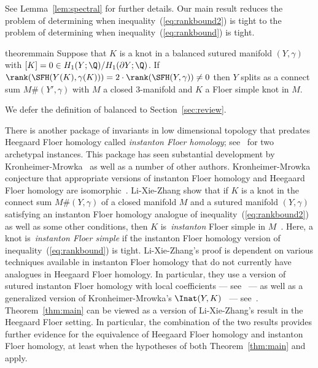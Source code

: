 \documentclass{amsart}
\theoremstyle{definition}
\theoremstyle{remark}
\numberwithin{equation}{section}
\begin{document}
See Lemma~\ref{lem:spectral} for further details. Our main result reduces the problem of determining when inequality~(\ref{eq:rankbound2}) is tight to the problem of determining when inequality~(\ref{eq:rankbound}) is tight.

\begin{restatable}{theorem}{main}\label{thm:main}
    Suppose that $K$ is a knot in a balanced sutured manifold $(Y,\gamma)$ with $[K]=0\in H_1(Y;\Q)/H_1(\partial Y;\Q)$. If $\rank(\SFH(Y(K),\gamma(K)))=2\cdot\rank(\SFH(Y,\gamma))\neq 0$ then $Y$ splits as a connect sum $M\# (Y',\gamma)$ with $M$ a closed $3$-manifold and $K$ a Floer simple knot in $M$.
\end{restatable}

\noindent We defer the definition of balanced to Section~\ref{sec:review}.

There is another package of invariants in low dimensional topology that predates Heegaard Floer homology called \emph{instanton Floer homology}; see~\cite{FLoerinstanton3manifolds,Floerinstatonhomologysurgeryknots} for two archetypal instances. This package has seen substantial development by Kronheimer-Mrowka~\cite{kronheimer2010knots,kronheimer2011khovanov,kronheimer2011knot} as well as a number of other authors. Kronheimer-Mrowka conjecture that appropriate versions of instanton Floer homology and Heegaard Floer homology are isomorphic~\cite[Conjecture 7.24]{kronheimer2010knots}. Li-Xie-Zhang show that if $K$ is a knot in the connect sum $M\#(Y,\gamma)$ of a closed manifold $M$ and a sutured manifold $(Y,\gamma)$ satisfying an instanton Floer homology analogue of inequality~(\ref{eq:rankbound2}) as well as some other conditions, then $K$ is~\emph{instanton} Floer simple in $M$~\cite[Theorem 1.4]{li2022floer}. Here, a knot is~\emph{instanton Floer simple} if the instanton Floer homology version of inequality~(\ref{eq:rankbound}) is tight. Li-Xie-Zhang's proof is dependent on various techniques available in instanton Floer homology that do not currently have analogues in Heegaard Floer homology. In particular, they use a version of sutured instanton Floer homology with local coefficients --- see~\cite[Section 2.5]{li2022floer} --- as well as a generalized version of Kronheimer-Mrowka's $\Inat(Y,K)$~\cite{kronheimer2011khovanov} --- see~\cite[Section 3.2]{li2022floer}. Theorem~\ref{thm:main} can be viewed as a version of Li-Xie-Zhang's result in the Heegaard Floer setting. In particular, the combination of the two results provides further evidence for the equivalence of Heegaard Floer homology and instanton Floer homology, at least when the hypotheses of both Theorem~\ref{thm:main} and~\cite[Theorem 1.4]{li2022floer} apply.
\end{document}
